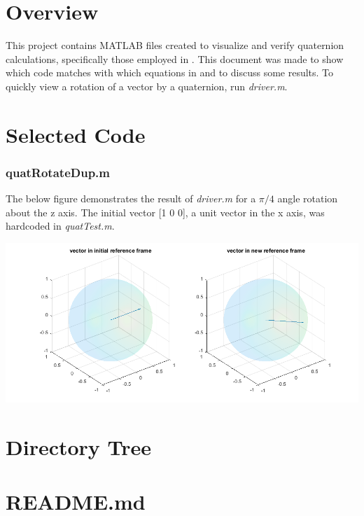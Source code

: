 \documentclass[10pt]{article}
\newcommand{\PP}{\par\hspace{1cm}}
\begin{document}
\section*{Overview}
\PP This project contains MATLAB files created to visualize and verify quaternion calculations, specifically those employed in \cite{Madgwick10}. This document was made to show which code matches with which equations in \cite{Madgwick10} and to discuss some results. To quickly view a rotation of a vector by a quaternion, run \textit{driver.m}.

\section*{Selected Code}

\subsubsection*{quatRotateDup.m}


\PP The below figure demonstrates the result of \textit{driver.m} for a $\pi/4$ angle rotation about the z axis. The initial vector [1 0 0], a unit vector in the x axis, was hardcoded in \textit{quatTest.m}.

\begin{center}
\includegraphics[width = 16cm]{./snap1.png}
\end{center}

\section*{Directory Tree}
\begin{flushleft}
\end{flushleft}

\newpage
\section*{README.md}


\newpage

\end{document}
